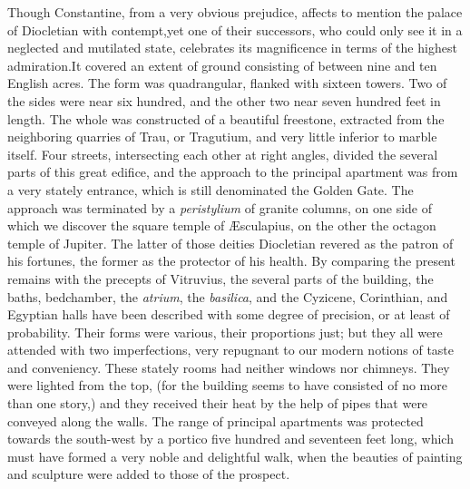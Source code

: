 


Though Constantine, from a very obvious prejudice, affects to
mention the palace of Diocletian with contempt,\footnotemark[118] yet one of
their successors, who could only see it in a neglected and
mutilated state, celebrates its magnificence in terms of the
highest admiration.\footnotemark[119] It covered an extent of ground consisting
of between nine and ten English acres. The form was quadrangular,
flanked with sixteen towers. Two of the sides were near six
hundred, and the other two near seven hundred feet in length. The
whole was constructed of a beautiful freestone, extracted from
the neighboring quarries of Trau, or Tragutium, and very little
inferior to marble itself. Four streets, intersecting each other
at right angles, divided the several parts of this great edifice,
and the approach to the principal apartment was from a very
stately entrance, which is still denominated the Golden Gate. The
approach was terminated by a \textit{peristylium} of granite columns, on
one side of which we discover the square temple of Æsculapius, on
the other the octagon temple of Jupiter. The latter of those
deities Diocletian revered as the patron of his fortunes, the
former as the protector of his health. By comparing the present
remains with the precepts of Vitruvius, the several parts of the
building, the baths, bedchamber, the \textit{atrium}, the \textit{basilica},
and the Cyzicene, Corinthian, and Egyptian halls have been
described with some degree of precision, or at least of
probability. Their forms were various, their proportions just;
but they all were attended with two imperfections, very repugnant
to our modern notions of taste and conveniency. These stately
rooms had neither windows nor chimneys. They were lighted from
the top, (for the building seems to have consisted of no more
than one story,) and they received their heat by the help of
pipes that were conveyed along the walls. The range of principal
apartments was protected towards the south-west by a portico five
hundred and seventeen feet long, which must have formed a very
noble and delightful walk, when the beauties of painting and
sculpture were added to those of the prospect.

